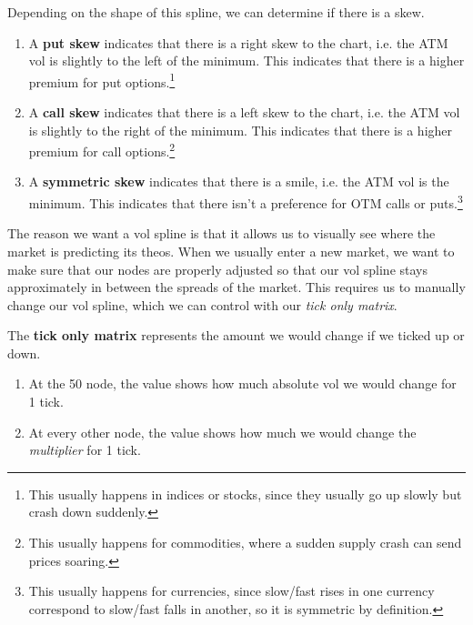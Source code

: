 \documentclass{article}
\begin{document}
    \begin{definition}[Skew]
      Depending on the shape of this spline, we can determine if there is a skew. 
      \begin{enumerate}
        \item A \textbf{put skew} indicates that there is a right skew to the chart, i.e. the ATM vol is slightly to the left of the minimum. This indicates that there is a higher premium for put options.\footnote{This usually happens in indices or stocks, since they usually go up slowly but crash down suddenly. }

        \item A \textbf{call skew} indicates that there is a left skew to the chart, i.e. the ATM vol is slightly to the right of the minimum. This indicates that there is a higher premium for call options.\footnote{This usually happens for commodities, where a sudden supply crash can send prices soaring. }

        \item A \textbf{symmetric skew} indicates that there is a smile, i.e. the ATM vol is the minimum. This indicates that there isn't a preference for OTM calls or puts.\footnote{This usually happens for currencies, since slow/fast rises in one currency correspond to slow/fast falls in another, so it is symmetric by definition. }
      \end{enumerate}
    \end{definition}

    The reason we want a vol spline is that it allows us to visually see where the market is predicting its theos. When we usually enter a new market, we want to make sure that our nodes are properly adjusted so that our vol spline stays approximately in between the spreads of the market. This requires us to manually change our vol spline, which we can control with our \textit{tick only matrix}. 

    \begin{definition}
      The \textbf{tick only matrix} represents the amount we would change if we ticked up or down. 
      \begin{enumerate}
        \item At the 50 node, the value shows how much absolute vol we would change for 1 tick. 
        \item At every other node, the value shows how much we would change the \textit{multiplier} for 1 tick. 
      \end{enumerate}
    \end{definition}
\end{document}
